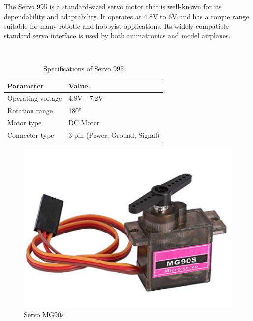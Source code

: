 \documentclass[12pt,a4paper]{report}
\begin{document}
\begin{itemize}
\par The Servo 995 is a standard-sized servo motor that is well-known for its dependability and adaptability. It operates at 4.8V to 6V and has a torque range suitable for many robotic and hobbyist applications. Its widely compatible standard servo interface is used by both animatronics and model airplanes.

\begin{table}[H]
\begin{center}
\caption{Specifications of Servo 995}%
\hspace*{0.2in}
\\
\begin{tabular}{| p{5cm} | p{5.5cm} |}
\hline
{\bf{Parameter}}             &{\bf{Value}}           \\ \hline
Operating voltage
& 4.8V - 7.2V \\ \hline

Rotation range
& 180° \\ \hline

Motor type
& DC Motor \\ \hline

Connector type
& 3-pin (Power, Ground, Signal) \\ \hline

\end{tabular}
\end{center}
\end{table}



\begin{figure}[H]
\begin{center}
\includegraphics[scale=0.7]{images/hardware/servo mg90s.png}
\caption{Servo MG90s}
\end{center}
\end{figure}


\end{itemize}
\end{document}
